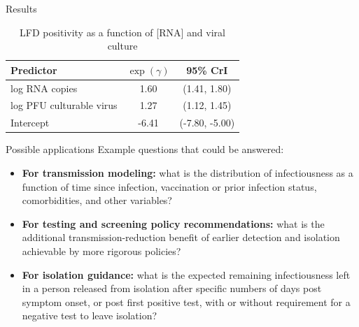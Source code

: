 \documentclass[9pt, aspectratio=169]{beamer}
\begin{document}
\begin{frame}{Results}
   \begin{table}[]
       \centering
       \caption{LFD positivity as a function of [RNA] and viral culture}
       \begin{tabular}{lcc}
        \toprule
        Predictor & $\exp(\gamma)$ & 95\% CrI\\
        \midrule
        log RNA copies & 1.60 & (1.41, 1.80)\\
        log PFU culturable virus & 1.27 & (1.12, 1.45)\\
        \midrule
        Intercept & -6.41 & (-7.80, -5.00)\\
        \bottomrule
        \end{tabular}
       \label{tab:lfd}
   \end{table}
\end{frame}

\begin{frame}{Possible applications}
    Example questions that could be answered:
    \begin{itemize}
        \item \textbf{For transmission modeling:} what is the distribution of infectiousness as a function of time since infection, vaccination or prior infection status, comorbidities, and other variables? 
        \vfill
        \item \textbf{For testing and screening policy recommendations:} what is the additional transmission-reduction benefit of earlier detection and isolation achievable by more rigorous policies? 
        \vfill
        \item \textbf{For isolation guidance:} what is the expected remaining infectiousness left in a person released from isolation after specific numbers of days post symptom onset, or post first positive test, with or without requirement for a negative test to leave isolation? 
    \end{itemize}

    \vfill
\end{frame}
\end{document}
